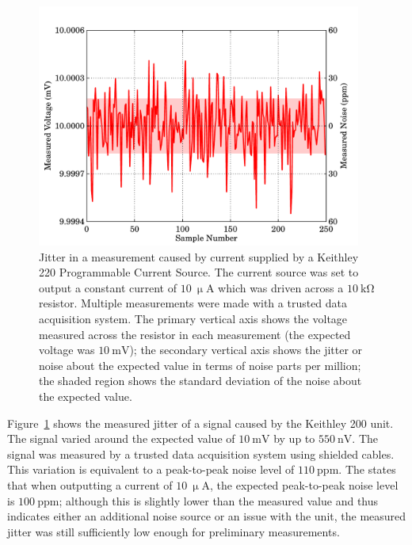 \begin{figure}[t]
\begin{center}
\includegraphics[width = 0.95\textwidth]{figures/keithley220_jitter}
\caption[Jitter from a Keithley 220 Current Source]{Jitter in a measurement caused by current supplied by a Keithley 220 Programmable Current Source. The current source was set to output a constant current of $10~\mathrm{\upmu A}$ which was driven across a $10~\mathrm{k\Omega}$ resistor. Multiple measurements were made with a trusted data acquisition system. The primary vertical axis shows the voltage measured across the resistor in each measurement (the expected voltage was $10~\mathrm{mV}$); the secondary vertical axis shows the jitter or noise about the expected value in terms of noise parts per million; the shaded region shows the standard deviation of the noise about the expected value.}
\label{fig:Keithley220_jitter}
\end{center}
\end{figure}
\par 
Figure~\ref{fig:Keithley220_jitter} shows the measured jitter of a signal caused by the Keithley 200 unit. The signal varied around the expected value of $10~\mathrm{mV}$ by up to $550~\mathrm{nV}$. The signal was measured by a trusted data acquisition system using shielded cables. This variation is equivalent to a peak-to-peak noise level of $110~\mathrm{ppm}$. The \textcite{Keithley220DS} states that when outputting a current of $10~\mathrm{\upmu A}$, the expected peak-to-peak noise level is $100~\mathrm{ppm}$; although this is slightly lower than the measured value and thus indicates either an additional noise source or an issue with the unit, the measured jitter was still sufficiently low enough for preliminary measurements. 
